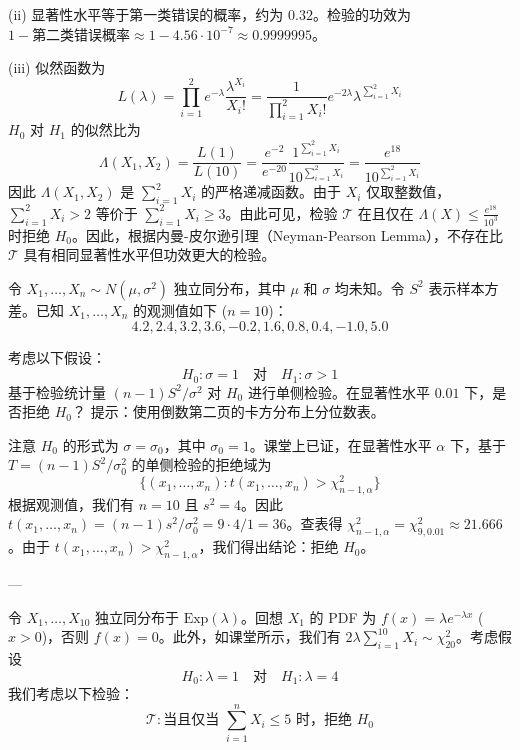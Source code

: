 \begin{questions}
\begin{solution}
(ii) 显著性水平等于第一类错误的概率，约为 $0.32$。检验的功效为 $1 - \text{第二类错误概率} \approx 1 - 4.56 \cdot 10^{-7} \approx 0.9999995$。

(iii) 似然函数为
\[
L(\lambda) = \prod_{i=1}^2 e^{-\lambda} \frac{\lambda^{X_i}}{X_i!} = \frac{1}{\prod_{i=1}^2 X_i!} e^{-2\lambda} \lambda^{\sum_{i=1}^2 X_i}
\]
$H_0$ 对 $H_1$ 的似然比为
\[
\Lambda(X_1, X_2) = \frac{L(1)}{L(10)} = \frac{e^{-2}}{e^{-20}} \frac{1^{\sum_{i=1}^2 X_i}}{10^{\sum_{i=1}^2 X_i}} = \frac{e^{18}}{10^{\sum_{i=1}^2 X_i}}
\]
因此 $\Lambda(X_1, X_2)$ 是 $\sum_{i=1}^2 X_i$ 的严格递减函数。由于 $X_i$ 仅取整数值，$\sum_{i=1}^2 X_i > 2$ 等价于 $\sum_{i=1}^2 X_i \ge 3$。由此可见，检验 $\mathcal{T}$ 在且仅在 $\Lambda(X) \le \frac{e^{18}}{10^3}$ 时拒绝 $H_0$。因此，根据内曼-皮尔逊引理（Neyman-Pearson Lemma），不存在比 $\mathcal{T}$ 具有相同显著性水平但功效更大的检验。
\end{solution}

\question
令 $X_1, \dots, X_n \sim N(\mu, \sigma^2)$ 独立同分布，其中 $\mu$ 和 $\sigma$ 均未知。令 $S^2$ 表示样本方差。已知 $X_1, \dots, X_n$ 的观测值如下 ($n = 10$)：
\[
4.2, 2.4, 3.2, 3.6, -0.2, 1.6, 0.8, 0.4, -1.0, 5.0
\]

考虑以下假设：
\[
H_0 : \sigma = 1 \quad \text{对} \quad H_1 : \sigma > 1
\]
基于检验统计量 $(n - 1) S^2 / \sigma^2$ 对 $H_0$ 进行单侧检验。在显著性水平 $0.01$ 下，是否拒绝 $H_0$？
提示：使用倒数第二页的卡方分布上分位数表。

\begin{solution}
注意 $H_0$ 的形式为 $\sigma = \sigma_0$，其中 $\sigma_0 = 1$。课堂上已证，在显著性水平 $\alpha$ 下，基于 $T = (n - 1) S^2 / \sigma_0^2$ 的单侧检验的拒绝域为
\[
\{(x_1, \dots, x_n) : t(x_1, \dots, x_n) > \chi^2_{n-1, \alpha}\}
\]
根据观测值，我们有 $n = 10$ 且 $s^2 = 4$。因此 $t(x_1, \dots, x_n) = (n - 1) s^2 / \sigma_0^2 = 9 \cdot 4 / 1 = 36$。查表得 $\chi^2_{n-1, \alpha} = \chi^2_{9, 0.01} \approx 21.666$。由于 $t(x_1, \dots, x_n) > \chi^2_{n-1, \alpha}$，我们得出结论：拒绝 $H_0$。
\end{solution}

---

\question
令 $X_1, \dots, X_{10}$ 独立同分布于 $\text{Exp}(\lambda)$。回想 $X_1$ 的 PDF 为 $f(x) = \lambda e^{-\lambda x}$ ($x > 0$)，否则 $f(x) = 0$。此外，如课堂所示，我们有 $2\lambda \sum_{i=1}^{10} X_i \sim \chi^2_{20}$。考虑假设
\[
H_0 : \lambda = 1 \quad \text{对} \quad H_1 : \lambda = 4
\]
我们考虑以下检验：
\[
\mathcal{T} : \text{当且仅当 } \sum_{i=1}^n X_i \le 5 \text{ 时，拒绝 } H_0
\]


\end{questions}
